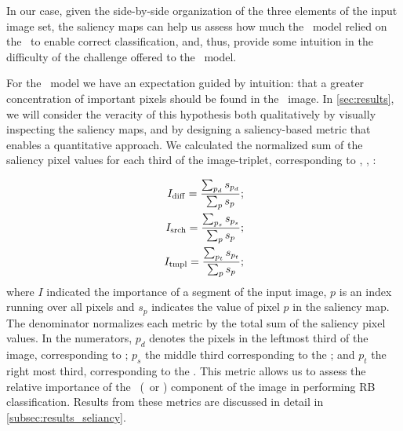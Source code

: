 In our case, given the side-by-side organization of the three elements of the input image set, %
the saliency maps can help us assess how much the \diabased\ model relied on the \diff\ to enable correct classification, and, thus, provide some intuition in the difficulty of the challenge offered to the \nodia\ model. 


For the \diabased\ model we have an expectation guided by intuition: that a greater concentration of important pixels should be found in the \diff\ image. In \autoref{sec:results},  we will consider the veracity of this hypothesis both qualitatively by visually inspecting the saliency maps, and by designing a saliency-based metric that enables a quantitative approach. We calculated the normalized sum of the saliency pixel values for each third of the image-triplet, corresponding to \diff, \search, \temp:

\begin{eqnarray}
\begin{split}
I_\mathrm{diff}=\frac{\sum_{p_d}{s_{p_d}}} {\sum_{p}{s_p}};\\
I_\mathrm{srch}=\frac{\sum_{p_s}{s_{p_s}}} {\sum_{p}{s_p}};\\
I_\mathrm{tmpl}=\frac{\sum_{p_t}{s_{p_t}}} {\sum_{p}{s_p}};
\label{eq: saliencymetric}
\end{split}
\end{eqnarray} 
where $I$ indicated the importance of a segment of the input image, $p$ is an index running over all pixels and $s_p$ indicates the value of pixel $p$ in the saliency map. The denominator normalizes each metric by the total sum of the saliency pixel values. In the numerators, $p_d$ denotes the pixels in the leftmost third of the image, corresponding to \diff; $p_s$ the middle third corresponding to the \search; and $p_t$ the right most third, corresponding to the \temp. 
This metric allows us to assess the relative importance of the \diff\ (\search\ or \temp) component of the image in performing RB classification. Results from these metrics are discussed in detail in \autoref{subsec:results_seliancy}.\\




